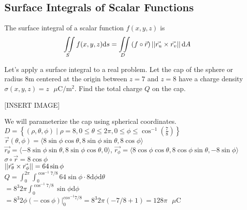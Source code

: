 \subsection{Surface Integrals of Scalar Functions}
\begin{definition}
	The surface integral of a scalar function $f(x,y,z)$ is
	\begin{equation*}
		\iint\limits_{S}{f(x,y,z)\mathrm{d}s} = \iint\limits_{D}{(f\circ\vec{r})\left|\left|\vec{r_u} \times \vec{r_v}\right|\right|\mathrm{d}A}
	\end{equation*}
\end{definition}

\noindent
Let’s apply a surface integral to a real problem. Let the cap of the sphere or radius $8\text{m}$ centered at the origin between $z = 7$ and $z = 8$ have a charge density $\sigma(x,y,z) = z \text{ } \mu \text{C}/ \text{m}^2$. Find the total charge $Q$ on the cap.

[INSERT IMAGE]

\indent
We will parameterize the cap using spherical coordinates.\\
\indent
$D = \left\{(\rho, \theta, \phi) \mid \rho=8, 0 \leq \theta \leq 2\pi, 0 \leq \phi \leq \cos^{-1}{\left(\frac{7}{8}\right)}\right\}$\\
\indent
$\vec{r}(\theta,\phi) = \langle 8\sin{\phi}\cos{\theta}, 8\sin{\phi}\sin{\theta}, 8\cos{\phi}\rangle$\\
\indent
$\vec{r_\theta} = \langle -8\sin{\phi}\sin{\theta}, 8\sin{\phi}\cos{\theta}, 0\rangle$, $\vec{r_\phi} = \langle 8\cos{\phi}\cos{\theta}, 8\cos{\phi}\sin{\theta}, -8\sin{\phi}\rangle$\\
\indent
$\sigma\circ\vec{r} = 8\cos{\phi}$\\
\indent
$\left|\left|\vec{r_\theta} \times \vec{r_\phi}\right|\right| = 64\sin{\phi}$\\
\indent
$Q = \int_{0}^{2\pi}{\int_{0}^{\cos^{-1}{7/8}}{64\sin{\phi} \cdot8 \mathrm{d}\phi\mathrm{d}\theta}}$\\
\indent
$= 8^3 2\pi \int_{0}^{\cos^{-1}{7/8}}{\sin{\phi}\mathrm{d}\phi}$\\
\indent
$= 8^3 2\phi(-\cos{\phi})\rvert_{0}^{cos^{-1}{7/8}} = 8^3 2\pi\left(-7/8 + 1\right) = 128\pi\text{ }\mu\text{C}$